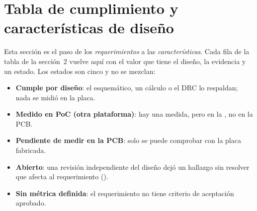 \section{Tabla de cumplimiento y características de diseño}
\label{sec:cumplimiento}

Esta sección es el paso de los \emph{requerimientos} a las \emph{características}. Cada fila de la
tabla de la sección~2 vuelve aquí con el valor que tiene el diseño, la evidencia y un estado. Los
estados son cinco y no se mezclan:

\begin{itemize}
  \item \textbf{Cumple por diseño}: el esquemático, un cálculo o el DRC lo respaldan; nada se midió en la placa.
  \item \textbf{Medido en PoC (otra plataforma)}: hay una medida, pero en la \pBoard{}, no en la PCB.
  \item \textbf{Pendiente de medir en la PCB}: solo se puede comprobar con la placa fabricada.
  \item \textbf{Abierto}: una revisión independiente del diseño dejó un hallazgo sin resolver que afecta al requerimiento ().
  \item \textbf{Sin métrica definida}: el requerimiento no tiene criterio de aceptación aprobado.
\end{itemize}

